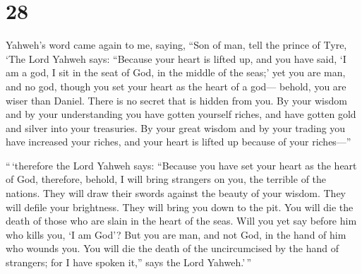 \hypertarget{section-27}{%
\section{28}\label{section-27}}

 Yahweh's word came again to me, saying, 
``Son of man, tell the prince of Tyre, `The Lord Yahweh says: ``Because
your heart is lifted up, and you have said, `I am a god, I sit in the
seat of God, in the middle of the seas;' yet you are man, and no god,
though you set your heart as the heart of a god--- 
behold, you are wiser than Daniel. There is no secret that is hidden
from you.  By your wisdom and by your understanding you
have gotten yourself riches, and have gotten gold and silver into your
treasuries.  By your great wisdom and by your trading you
have increased your riches, and your heart is lifted up because of your
riches---''

 ``\,`therefore the Lord Yahweh says: ``Because you have
set your heart as the heart of God,  therefore, behold, I
will bring strangers on you, the terrible of the nations. They will draw
their swords against the beauty of your wisdom. They will defile your
brightness.  They will bring you down to the pit. You will
die the death of those who are slain in the heart of the seas.
 Will you yet say before him who kills you, `I am God'?
But you are man, and not God, in the hand of him who wounds you.
 You will die the death of the uncircumcised by the hand
of strangers; for I have spoken it,'' says the Lord Yahweh.'\,''

